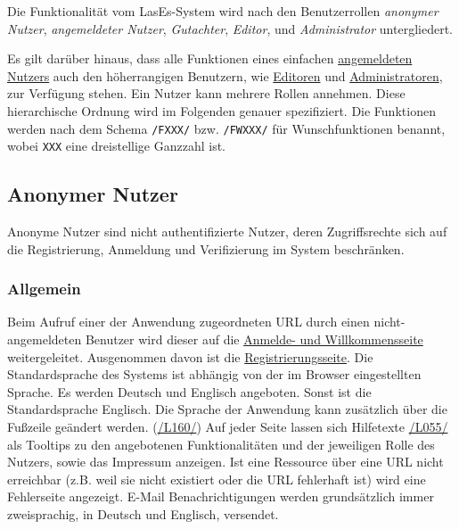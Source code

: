 

Die Funktionalität vom LasEs-System wird nach den Benutzerrollen
\textit{anonymer Nutzer}, \textit{angemeldeter Nutzer}, \textit{Gutachter}, \textit{Editor}, und
\textit{Administrator} untergliedert.

Es gilt darüber hinaus, dass alle Funktionen eines einfachen \hyperref[glo:regnutzer]{angemeldeten Nutzers} auch den höherrangigen Benutzern, wie
\hyperref[glo:editor]{Editoren} und \hyperref[glo:admin]{Administratoren}, zur Verfügung stehen. Ein Nutzer kann mehrere Rollen annehmen.
Diese hierarchische Ordnung wird im Folgenden genauer spezifiziert.
Die Funktionen werden nach dem Schema \texttt{/FXXX/} bzw. \texttt{/FWXXX/} für Wunschfunktionen benannt, wobei \texttt{XXX} eine dreistellige Ganzzahl ist.

\subsection{Anonymer Nutzer}\label{funkt:nutzer}
Anonyme Nutzer sind nicht authentifizierte Nutzer, deren Zugriffsrechte sich
auf die Registrierung, Anmeldung und Verifizierung im System beschränken.

\subsubsection{Allgemein}
\begin{description}
     Beim Aufruf einer der Anwendung zugeordneten URL durch einen nicht-angemeldeten Benutzer
    wird dieser auf die \hyperref[an:log]{Anmelde- und Willkommensseite} weitergeleitet. Ausgenommen davon ist die \hyperref[an:reg]{Registrierungsseite}.
     Die Standardsprache des Systems ist abhängig von der im Browser
    eingestellten Sprache. Es werden Deutsch und Englisch angeboten.
    Sonst ist die Standardsprache Englisch. Die Sprache der Anwendung kann zusätzlich über die
    Fußzeile geändert werden. (\hyperref[leist:160]{/L160/})
     Auf jeder Seite lassen sich
    Hilfetexte \hyperref[leist:055]{/L055/} als Tooltips zu den angebotenen Funktionalitäten und der jeweiligen Rolle
    des Nutzers, sowie das Impressum anzeigen.
     Ist eine Ressource über eine URL nicht erreichbar (z.B. weil sie nicht existiert oder
     die URL fehlerhaft ist) wird eine Fehlerseite angezeigt.
     E-Mail Benachrichtigungen werden grundsätzlich immer zweisprachig,
    in Deutsch und Englisch, versendet.
\end{description}


